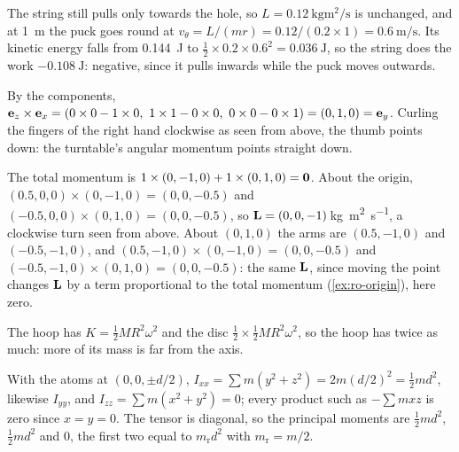 \label{sec:ro-answers}

The string still pulls only towards the hole, so
$L = \SI{0.12}{\kilogram\metre\squared\per\second}$ is unchanged, and at
\SI{1}{\metre} the puck goes round at $v_\theta = L/(mr) = 0.12/(0.2\times1)
= \SI{0.6}{\metre\per\second}$. Its kinetic energy falls from
\SI{0.144}{\joule} to $\frac12\times0.2\times0.6^2 = \SI{0.036}{\joule}$,
so the string does the work $\SI{-0.108}{\joule}$: negative, since it
pulls inwards while the puck moves outwards.

By the components, $\bm{\mathrm{e}}_z\times\bm{\mathrm{e}}_x = (0
\times0 - 1\times0,\ 1\times1 - 0\times0,\ 0\times0 - 0\times1) = (0, 1, 0)
= \bm{\mathrm{e}}_y$. Curling the fingers of the right hand clockwise as seen from
above, the thumb points down: the turntable's angular momentum points
straight down.

The total momentum is $1\times(0, -1, 0) +
1\times(0, 1, 0) = \bm{\mathrm{0}}$. About the origin, $(0.5, 0, 0)\times(0, -1, 0)
= (0, 0, -0.5)$ and $(-0.5, 0, 0)\times(0, 1, 0) = (0, 0, -0.5)$, so
$\bm{\mathrm{L}} = (0, 0, -1)$\,\si{\kilogram\metre\squared\per\second}, a
clockwise turn seen from above. About $(0, 1, 0)$ the arms are
$(0.5, -1, 0)$ and $(-0.5, -1, 0)$, and $(0.5, -1, 0)\times(0, -1, 0) = (0,
0, -0.5)$ and $(-0.5, -1, 0)\times(0, 1, 0) = (0, 0, -0.5)$: the same
$\bm{\mathrm{L}}$, since moving the point changes $\bm{\mathrm{L}}$ by a term proportional to
the total momentum (\cref{ex:ro-origin}), here zero.

The hoop has $K = \frac12 MR^2\omega^2$ and the disc
$\frac12\times\frac12 MR^2\omega^2$, so the hoop has twice as much: more of
its mass is far from the axis.

With the atoms at $(0, 0, \pm d/2)$, $I_{xx} =
\sum m(y^2 + z^2) = 2m(d/2)^2 = \frac12 md^2$, likewise $I_{yy}$, and
$I_{zz} = \sum m(x^2 + y^2) = 0$; every product such as $-\sum mxz$ is
zero since $x = y = 0$. The tensor is diagonal, so the principal moments
are $\frac12 md^2$, $\frac12 md^2$ and 0, the first two equal to $m_{\mathrm
r}d^2$ with $m_{\mathrm r} = m/2$.

